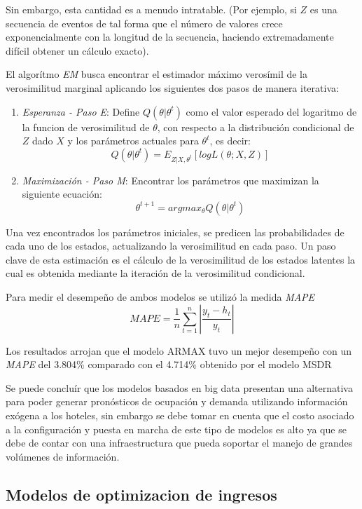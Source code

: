 {Sin embargo, esta cantidad es a menudo intratable. (Por ejemplo, si $Z$ es una secuencia de eventos de tal forma que el número de valores crece exponencialmente con la longitud de la secuencia, haciendo extremadamente difícil obtener un cálculo exacto).

El algorítmo \emph{EM} busca encontrar el estimador máximo verosímil de la verosimilitud marginal aplicando los siguientes dos pasos de manera iterativa:

\begin{enumerate}
  \item \emph{Esperanza - Paso E}: Define $Q(\theta|\theta^t)$ como el valor esperado del logaritmo de la funcion de verosimilitud de $\theta$, con respecto a la distribución condicional de $Z$ dado $X$ y los parámetros actuales para $\theta^t$, es decir: $$Q(\theta|\theta^t) = E_{Z|X,\theta^t}[log L(\theta;X,Z)]$$
  \item \emph{Maximización - Paso M}: Encontrar los parámetros que maximizan la siguiente ecuación: $$\theta^{t+1} = argmax_\theta Q(\theta|\theta^t)$$
\end{enumerate}


Una vez encontrados los parámetros iniciales, se predicen las probabilidades de cada uno de los estados, actualizando la verosimilitud en cada paso. Un paso clave de esta estimación es el cálculo de la verosimilitud de los estados latentes la cual es obtenida mediante la iteración de la verosimilitud condicional.

Para medir el desempeño de ambos modelos se utilizó la medida \emph{MAPE} $$MAPE=\frac{1}{n}\sum_{t=1}^{n}|\frac{y_t-h_t}{y_t}|$$ 

Los resultados arrojan que el modelo ARMAX tuvo un mejor desempeño con un \emph{MAPE} del 3.804\% comparado con el 4.714\% obtenido por el modelo MSDR

Se puede concluír que los modelos basados en big data presentan una alternativa para poder generar pronósticos de ocupación y demanda utilizando información exógena a los hoteles, sin embargo se debe tomar en cuenta que el costo asociado a la configuración y puesta en marcha de este tipo de modelos es alto ya que se debe de contar con una infraestructura que pueda soportar el manejo de grandes volúmenes de información.


\subsection*{Modelos de optimizacion de ingresos}

}
